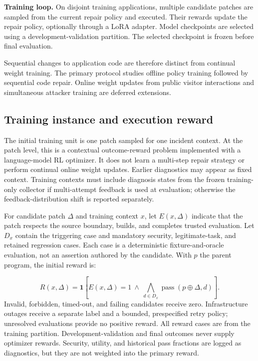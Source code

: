 \documentclass[11pt,a4paper]{article}
\begin{document}
\textbf{Training loop.} On disjoint training applications, multiple candidate patches are sampled from the current repair policy and executed. Their rewards update the repair policy, optionally through a LoRA adapter. Model checkpoints are selected using a development-validation partition. The selected checkpoint is frozen before final evaluation.

Sequential changes to application code are therefore distinct from continual weight training. The primary protocol studies offline policy training followed by sequential code repair. Online weight updates from public visitor interactions and simultaneous attacker training are deferred extensions.

\subsection{Training instance and execution reward}
The initial training unit is one patch sampled for one incident context. At the patch level, this is a contextual outcome-reward problem implemented with a language-model RL optimizer. It does not learn a multi-step repair strategy or perform continual online weight updates. Earlier diagnostics may appear as fixed context. Training contexts must include diagnosis states from the frozen training-only collector if multi-attempt feedback is used at evaluation; otherwise the feedback-distribution shift is reported separately.

For candidate patch $\Delta$ and training context $x$, let $E(x,\Delta)$ indicate that the patch respects the source boundary, builds, and completes trusted evaluation. Let $D_x$ contain the triggering case and mandatory security, legitimate-task, and retained regression cases. Each case is a deterministic fixture-and-oracle evaluation, not an assertion authored by the candidate. With $p$ the parent program, the initial reward is:

\begin{equation}
R(x,\Delta)=\mathbf{1}\!\left[E(x,\Delta)=1\ \land\ \bigwedge_{d\in D_x}\operatorname{pass}(p\oplus\Delta,d)\right].
\end{equation}
Invalid, forbidden, timed-out, and failing candidates receive zero. Infrastructure outages receive a separate label and a bounded, prespecified retry policy; unresolved evaluations provide no positive reward. All reward cases are from the training partition. Development-validation and final outcomes never supply optimizer rewards. Security, utility, and historical pass fractions are logged as diagnostics, but they are not weighted into the primary reward.
\end{document}

